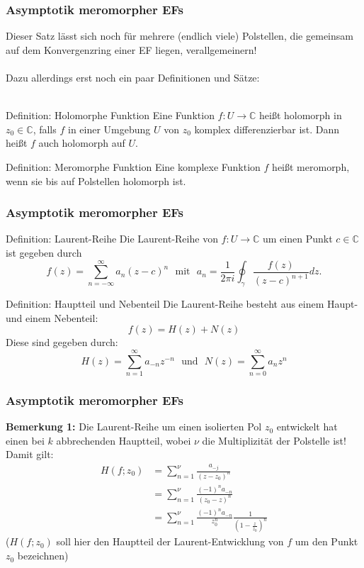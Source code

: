 \documentclass{beamer}
\begin{document}
\begin{frame}\frametitle{Asymptotik meromorpher EFs}
  Dieser Satz lässt sich noch für mehrere (endlich viele) Polstellen, die gemeinsam auf dem Konvergenzring einer EF liegen, verallgemeinern! \\
  \qquad \\
  Dazu allerdings erst noch ein paar Definitionen und Sätze: \\
  \qquad \\
  \begin{block}{Definition: Holomorphe Funktion}
  	Eine Funktion $f: U \rightarrow \mathbb{C}$ heißt holomorph in $z_0 \in \mathbb{C}$, falls $f$ in einer Umgebung $U$ von $z_0$ komplex differenzierbar ist. Dann heißt $f$ auch holomorph auf $U$.
  \end{block}
  \begin{block}{Definition: Meromorphe Funktion}
    Eine komplexe Funktion $f$ heißt meromorph, wenn sie bis auf Polstellen holomorph ist.
  \end{block}
\end{frame}

\begin{frame}\frametitle{Asymptotik meromorpher EFs}
  \begin{block}{Definition: Laurent-Reihe}
  	Die Laurent-Reihe von $f: U \rightarrow \mathbb{C}$ um einen Punkt $c \in \mathbb{C}$ ist gegeben durch
  	\[
  	  f(z) = \sum\limits_{n = -\infty}^\infty a_n (z - c)^n
  	  \,\, \text{ mit } \,\,
  	  a_n = \frac{1}{2 \pi i} \oint_\gamma \frac{f(z)}{(z - c)^{n + 1}} dz \text{.}
  	\]
  \end{block}
  \begin{block}{Definition: Hauptteil und Nebenteil}
    Die Laurent-Reihe besteht aus einem Haupt- und einem Nebenteil:
    \[
      f(z) = H(z) + N(z)
    \]
    Diese sind gegeben durch:
    \[
      H(z) = \sum\limits_{n = 1}^\infty a_{-n} z^{-n}
      \,\, \text{ und } \,\,
      N(z) = \sum\limits_{n = 0}^\infty a_n z^n
    \]
  \end{block}
\end{frame}

\begin{frame}\frametitle{Asymptotik meromorpher EFs}
  \textbf{Bemerkung 1:} Die Laurent-Reihe um einen isolierten Pol $z_0$ entwickelt hat einen bei $k$ abbrechenden Hauptteil, wobei $\nu$ die Multiplizität der Polstelle ist! Damit gilt:
  \begin{align*}
    H(f; z_0) &= \sum\limits_{n = 1}^\nu \frac{a_{-j}}{(z - z_0)^n} \\
              &= \sum\limits_{n = 1}^\nu \frac{(-1)^n a_{-n}}{(z_0 - z)^n} \\
              &= \sum\limits_{n = 1}^\nu \frac{(-1)^n a_{-n}}{z_0^n} \frac{1}{(1 - \frac{z}{z_0})^n}
  \end{align*}
  ($H(f; z_0)$ soll hier den Hauptteil der Laurent-Entwicklung von $f$ um den Punkt $z_0$ bezeichnen)
\end{frame}
\end{document}
